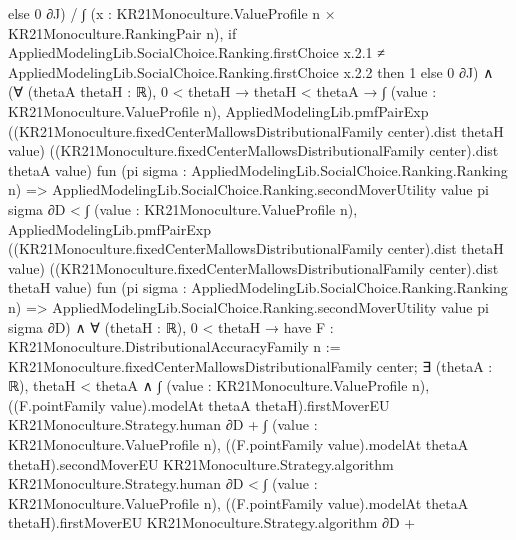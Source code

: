 \documentclass[10pt]{article}
\begin{document}
\begin{ReviewVerbatim}
                          else 0 ∂J) /
                        ∫ (x : KR21Monoculture.ValueProfile n × KR21Monoculture.RankingPair n),
                          if
                              AppliedModelingLib.SocialChoice.Ranking.firstChoice x.2.1 ≠
                                AppliedModelingLib.SocialChoice.Ranking.firstChoice x.2.2 then
                            1
                          else 0 ∂J) ∧
              (∀ (thetaA thetaH : ℝ),
                  0 < thetaH →
                    thetaH < thetaA →
                      ∫ (value : KR21Monoculture.ValueProfile n),
                          AppliedModelingLib.pmfPairExp
                            ((KR21Monoculture.fixedCenterMallowsDistributionalFamily center).dist thetaH value)
                            ((KR21Monoculture.fixedCenterMallowsDistributionalFamily center).dist thetaA value)
                            fun (pi sigma : AppliedModelingLib.SocialChoice.Ranking.Ranking n) =>
                            AppliedModelingLib.SocialChoice.Ranking.secondMoverUtility value pi sigma ∂D <
                        ∫ (value : KR21Monoculture.ValueProfile n),
                          AppliedModelingLib.pmfPairExp
                            ((KR21Monoculture.fixedCenterMallowsDistributionalFamily center).dist thetaH value)
                            ((KR21Monoculture.fixedCenterMallowsDistributionalFamily center).dist thetaH value)
                            fun (pi sigma : AppliedModelingLib.SocialChoice.Ranking.Ranking n) =>
                            AppliedModelingLib.SocialChoice.Ranking.secondMoverUtility value pi sigma ∂D) ∧
                ∀ (thetaH : ℝ),
                  0 < thetaH →
                    have F : KR21Monoculture.DistributionalAccuracyFamily n :=
                      KR21Monoculture.fixedCenterMallowsDistributionalFamily center;
                    ∃ (thetaA : ℝ),
                      thetaH < thetaA ∧
                        ∫ (value : KR21Monoculture.ValueProfile n),
                                ((F.pointFamily value).modelAt thetaA thetaH).firstMoverEU
                                  KR21Monoculture.Strategy.human ∂D +
                              ∫ (value : KR21Monoculture.ValueProfile n),
                                ((F.pointFamily value).modelAt thetaA thetaH).secondMoverEU
                                  KR21Monoculture.Strategy.algorithm KR21Monoculture.Strategy.human ∂D <
                            ∫ (value : KR21Monoculture.ValueProfile n),
                                ((F.pointFamily value).modelAt thetaA thetaH).firstMoverEU
                                  KR21Monoculture.Strategy.algorithm ∂D +

\end{ReviewVerbatim}
\end{document}
